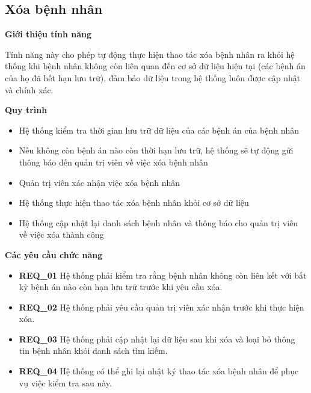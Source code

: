 \subsection{Xóa bệnh nhân}

\noindent \textbf{Giới thiệu tính năng}

Tính năng này cho phép tự động thực hiện thao tác xóa bệnh nhân ra khỏi hệ thống khi bệnh nhân không còn liên quan đến cơ sở dữ liệu hiện tại (các bệnh án của họ đã hết hạn lưu trữ), đảm bảo dữ liệu trong hệ thống luôn được cập nhật và chính xác.

\noindent \textbf{Quy trình}

\begin{itemize}

  \item Hệ thống kiểm tra thời gian lưu trữ dữ liệu của các bệnh án của bệnh nhân

  \item Nếu không còn bệnh án nào còn thời hạn lưu trữ, hệ thống sẽ tự động gửi thông báo đến quản trị viên về việc xóa bệnh nhân

  \item Quản trị viên xác nhận việc xóa bệnh nhân

  \item Hệ thống thực hiện thao tác xóa bệnh nhân khỏi cơ sở dữ liệu

  \item Hệ thống cập nhật lại danh sách bệnh nhân và thông báo cho quản trị viên về việc xóa thành công

\end{itemize}

\noindent \textbf{Các yêu cầu chức năng}

\begin{itemize}

  \item \textbf{REQ\_01} Hệ thống phải kiểm tra rằng bệnh nhân không còn liên kết với bất kỳ bệnh án nào còn hạn lưu trữ trước khi yêu cầu xóa.

  \item \textbf{REQ\_02} Hệ thống phải yêu cầu quản trị viên xác nhận trước khi thực hiện xóa.

  \item \textbf{REQ\_03} Hệ thống phải cập nhật lại dữ liệu sau khi xóa và loại bỏ thông tin bệnh nhân khỏi danh sách tìm kiếm.

  \item \textbf{REQ\_04} Hệ thống có thể ghi lại nhật ký thao tác xóa bệnh nhân để phục vụ việc kiểm tra sau này.

\end{itemize}
